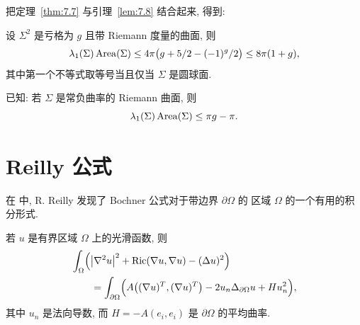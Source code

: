 把定理~\ref{thm:7.7} 与引理~\ref{lem:7.8} 结合起来, 得到:

\begin{theorem}
\label{thm:7.9}
设 $\Sigma^2$ 是亏格为 $g$ 且带 Riemann 度量的曲面, 则
\begin{equation}
\lambda_1(\Sigma)\operatorname{Area}(\Sigma)
\leq4\pi\bigl(g+5/2-(-1)^g/2\bigr)
\leq8\pi(1+g),
\label{eq:7.48}
\end{equation}
其中第一个不等式取等号当且仅当 $\Sigma$ 是圆球面.
\end{theorem}

已知: 若 $\Sigma$ 是常负曲率的 Riemann 曲面, 则
\begin{equation}
\lambda_1(\Sigma)\operatorname{Area}(\Sigma)\leq\pi g-\pi.
\label{eq:7.49}
\end{equation}

\section{Reilly 公式}
\label{sec:7.3}

在 \cite{Ry} 中, R. Reilly 发现了 Bochner 公式对于带边界 $\partial\Omega$ 的
区域 $\Omega$ 的一个有用的积分形式.

\begin{lemma}
\label{lem:7.10}
若 $u$ 是有界区域 $\Omega$ 上的光滑函数, 则
\begin{equation}
\begin{aligned}
&\int_{\Omega}\Bigl(\bigl|\nabla^2u\bigr|^2
+\operatorname{Ric}(\nabla u,\nabla u)-(\Delta u)^2\Bigr)\\
&\qquad=\int_{\partial\Omega}\Bigl(A\bigl((\nabla u)^T,(\nabla u)^T\bigr)
-2u_n\Delta_{\partial\Omega}u+Hu_n^2\Bigr),
\end{aligned}
\label{eq:7.50}
\end{equation}
其中 $u_n$ 是法向导数, 而 $H=-A(e_i,e_i)$ 是 $\partial\Omega$ 的平均曲率.
\end{lemma}

